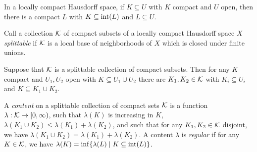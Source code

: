 \begin{prop} In a locally compact Hausdorff space, if $K \subseteq U$ with $K$ compact and $U$ open, then there is a compact $L$ with $K \subseteq \operatorname{int}(L)$ and $L \subseteq U$.
\end{prop}

\begin{defn} Call a collection $\mathcal{K}$ of compact subsets of a locally compact Hausdorff space $X$ \emph{splittable} if $\mathcal{K}$ is a local base of neighborhoods of $X$ which is closed under finite unions.
\end{defn}

\begin{prop} Suppose that $\mathcal{K}$ is a splittable collection of compact subsets. Then for any $K$ compact and $U_1,U_2$ open with $K \subseteq U_1 \cup U_2$ there are $K_1,K_2 \in \mathcal{K}$ with $K_i \subseteq U_i$ and $K \subseteq K_1\cup K_2$.
\end{prop}

\begin{defn} A \emph{content} on a splittable collection of compact sets $\mathcal{K}$ is a function $\lambda : \mathcal{K} \rightarrow [0,\infty)$, such that $\lambda(K)$ is increasing in $K$, $\lambda(K_1 \cup K_2) \le \lambda(K_1) + \lambda(K_2)$, and such that for any $K_1, K_2 \in \mathcal{K}$ disjoint, we have $\lambda(K_1 \cup K_2) = \lambda(K_1) + \lambda(K_2)$. A content $\lambda$ is \emph{regular} if for any $K \in \mathcal{K}$, we have $\lambda(K) = \inf \{\lambda(L) \mid K \subseteq \operatorname{int}(L)\}$.
\end{defn}

